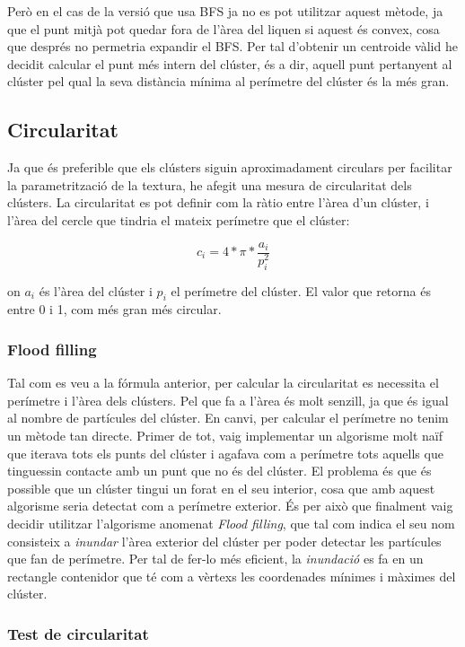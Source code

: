\documentclass{article}
\begin{document}
Però en el cas de la versió que usa BFS ja no es pot utilitzar aquest mètode, ja que el punt mitjà pot quedar fora de l'àrea del liquen si aquest és convex, cosa que després no permetria expandir el BFS. Per tal d'obtenir un centroide vàlid he decidit calcular el punt més intern del clúster, és a dir, aquell punt pertanyent al clúster pel qual la seva distància mínima al perímetre del clúster és la més gran.

\subsection{Circularitat}

Ja que és preferible que els clústers siguin aproximadament circulars per facilitar la parametrització de la textura, he afegit una mesura de circularitat dels clústers. La circularitat es pot definir com la ràtio entre l'àrea d'un clúster, i l'àrea del cercle que tindria el mateix perímetre que el clúster:

$$c_i = 4 * \pi * \frac{a_i}{p_i^2}$$

on $a_i$ és l'àrea del clúster i $p_i$ el perímetre del clúster. El valor que retorna és entre 0 i 1, com més gran més circular.

\subsubsection{Flood filling \label{subsubsec:flood-filling}}

Tal com es veu a la fórmula anterior, per calcular la circularitat es necessita el perímetre i l'àrea dels clústers. Pel que fa a l'àrea és molt senzill, ja que és igual al nombre de partícules del clúster. En canvi, per calcular el perímetre no tenim un mètode tan directe. Primer de tot, vaig implementar un algorisme molt naïf que iterava tots els punts del clúster i agafava com a perímetre tots aquells que tinguessin contacte amb un punt que no és del clúster. El problema és que és possible que un clúster tingui un forat en el seu interior, cosa que amb aquest algorisme seria detectat com a perímetre exterior. És per això que finalment vaig decidir utilitzar l'algorisme anomenat \textit{Flood filling}, que tal com indica el seu nom consisteix a \textit{inundar} l'àrea exterior del clúster per poder detectar les partícules que fan de perímetre. Per tal de fer-lo més eficient, la \textit{inundació} es fa en un rectangle contenidor que té com a vèrtexs les coordenades mínimes i màximes del clúster.

\subsubsection{Test de circularitat}
\end{document}
